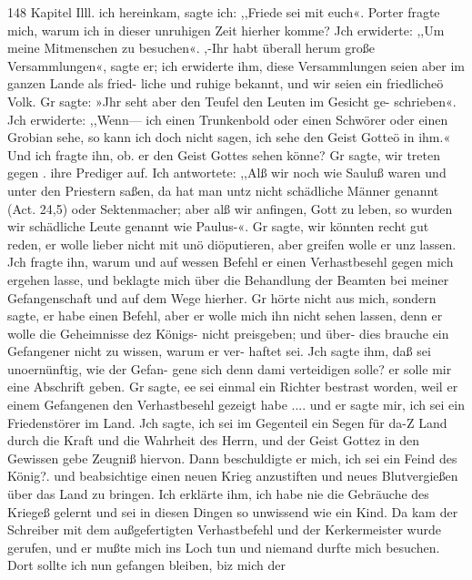 148 Kapitel Illl.
ich hereinkam, sagte ich: ,,Friede sei mit euch«. Porter fragte
mich, warum ich in dieser unruhigen Zeit hierher komme? Jch
erwiderte: ,,Um meine Mitmenschen zu besuchen«. ,-Ihr habt
überall herum große Versammlungen«, sagte er; ich erwiderte
ihm, diese Versammlungen seien aber im ganzen Lande als fried-
liche und ruhige bekannt, und wir seien ein friedlicheö Volk. Gr
sagte: »Jhr seht aber den Teufel den Leuten im Gesicht ge-
schrieben«. Jch erwiderte: ,,Wenn— ich einen Trunkenbold oder
einen Schwörer oder einen Grobian sehe, so kann ich doch nicht
sagen, ich sehe den Geist Gotteö in ihm.« Und ich fragte ihn, ob.
er den Geist Gottes sehen könne? Gr sagte, wir treten gegen .
ihre Prediger auf. Ich antwortete: ,,Alß wir noch wie Sauluß waren
und unter den Priestern saßen, da hat man untz nicht schädliche
Männer genannt (Act. 24,5) oder Sektenmacher; aber alß wir
anfingen, Gott zu leben, so wurden wir schädliche Leute genannt
wie Paulus-«. Gr sagte, wir könnten recht gut reden, er wolle
lieber nicht mit unö diöputieren, aber greifen wolle er unz lassen. Jch
fragte ihn, warum und auf wessen Befehl er einen Verhastbesehl
gegen mich ergehen lasse, und beklagte mich über die Behandlung
der Beamten bei meiner Gefangenschaft und auf dem Wege
hierher. Gr hörte nicht aus mich, sondern sagte, er habe einen
Befehl, aber er wolle mich ihn nicht sehen lassen, denn er
wolle die Geheimnisse dez Königs- nicht preisgeben; und über-
dies brauche ein Gefangener nicht zu wissen, warum er ver-
haftet sei. Jch sagte ihm, daß sei unoernünftig, wie der Gefan-
gene sich denn dami verteidigen solle? er solle mir eine Abschrift
geben. Gr sagte, ee sei einmal ein Richter bestrast worden, weil
er einem Gefangenen den Verhastbesehl gezeigt habe .... und
er sagte mir, ich sei ein Friedenstörer im Land. Jch sagte, ich
sei im Gegenteil ein Segen für da-Z Land durch die Kraft und
die Wahrheit des Herrn, und der Geist Gottez in den Gewissen
gebe Zeugniß hiervon. Dann beschuldigte er mich, ich sei ein
Feind des König?. und beabsichtige einen neuen Krieg anzustiften
und neues Blutvergießen über das Land zu bringen. Ich erklärte
ihm, ich habe nie die Gebräuche des Kriegeß gelernt und sei in
diesen Dingen so unwissend wie ein Kind. Da kam der Schreiber
mit dem außgefertigten Verhastbefehl und der Kerkermeister wurde
gerufen, und er mußte mich ins Loch tun und niemand durfte
mich besuchen. Dort sollte ich nun gefangen bleiben, biz mich der


